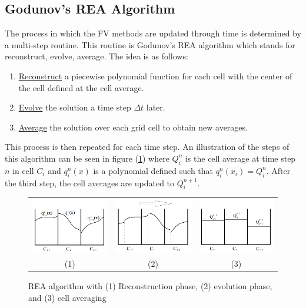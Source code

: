 \subsection{Godunov's REA Algorithm}
The process in which the FV methods are updated through time is determined by a multi-step routine. This routine is Godunov's REA algorithm which stands for reconstruct, evolve, average. The idea is as follows:
%
\begin{enumerate}
\item \underline{Reconstruct} a piecewise polynomial function for each cell with the center of the cell defined at the cell average.
\item \underline{Evolve} the solution a time step $\Delta t$ later.
\item \underline{Average} the solution over each grid cell to obtain new averages.
\end{enumerate}
%
This process is then repeated for each time step. An illustration of the steps of this algorithm can be seen in figure (\ref{REA}) where $Q_i^n$ is the cell average at time step $n$ in cell $C_i$ and $q_i^n(x)$ is a polynomial defined such that $q_i^n(x_i) = Q_i^n$. After the third step, the cell averages are updated to $Q_i^{n+1}$.
%
\begin{figure}[ht!]
\label{REA}
\centering
\begin{tabular}{ccc}
\includegraphics[angle=0,width=48mm]{FV/reconstruct.pdf} & \includegraphics[angle=0,width=48mm]{FV/evolve.pdf} & \includegraphics[angle=0,width=48mm]{FV/average.pdf}\\
{\small (1)} & {\small (2)} & {\small (3)}
\end{tabular}
\caption{REA algorithm with (1) Reconstruction phase, (2) evolution phase, and (3) cell averaging}
\end{figure}
